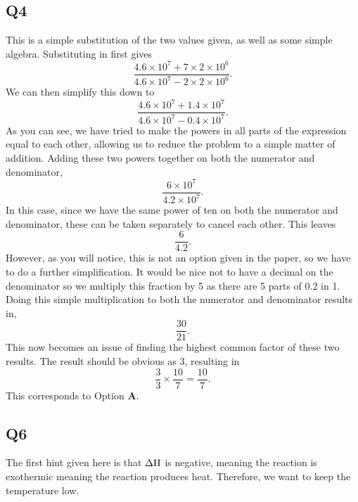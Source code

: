 \documentclass[11pt]{article}
\begin{document}
\subsection*{Q4}
This is a simple substitution of the two values given, as well as some simple algebra.  Substituting in first gives
\begin{equation*}
\frac{4.6 \times 10^7 + 7 \times 2 \times 10^6}{4.6 \times 10^7 - 2 \times 2 \times 10^6 }.
\end{equation*}
We can then simplify this down to
\begin{equation*}
\frac{4.6 \times 10^7 + 1.4 \times 10^7}{4.6 \times 10^7 - 0.4 \times 10^7 }.
\end{equation*}
As you can see, we have tried to make the powers in all parts of the expression equal to each other, allowing us to reduce the problem to a simple matter of addition.  Adding these two powers together on both the numerator and denominator,
\begin{equation*}
\frac{6 \times 10^7}{4.2 \times 10^7 }.
\end{equation*}
In this case, since we have the same power of ten on both the numerator and denominator, these can be taken separately to cancel each other.  This leaves 
\begin{equation*}
\frac{6}{4.2}.
\end{equation*}
However, as you will notice, this is not an option given in the paper, so we have to do a further simplification.  It would be nice not to have a decimal on the denominator so we multiply this fraction by 5 as there are 5 parts of 0.2 in 1.  Doing this simple multiplication to both the numerator and denominator results in,
\begin{equation*}
\frac{30}{21}.
\end{equation*}
This now becomes an issue of finding the highest common factor of these two results.  The result should be obvious as 3, resulting in
\begin{equation*}
\frac{3}{3} \times \frac{10}{7} = \frac{10}{7}.
\end{equation*}
This corresponds to Option \textbf{A}.

\subsection*{Q6}
The first hint given here is that $\rm{\Delta H}$ is negative, meaning the reaction is exothermic meaning the reaction produces heat.  Therefore, we want to keep the temperature low.
\end{document}
